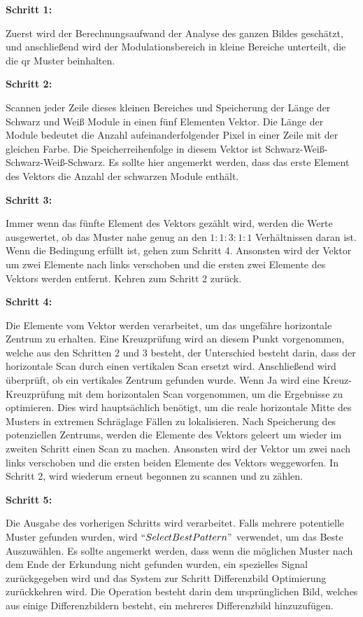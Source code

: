 \textbf{Schritt 1:}

Zuerst wird der Berechnungsaufwand der Analyse des ganzen Bildes geschätzt, und anschließend wird der Modulationsbereich in kleine Bereiche unterteilt, die die \gls{qr} Muster beinhalten.

\textbf{Schritt 2:}

Scannen jeder Zeile dieses kleinen Bereiches und Speicherung der Länge der Schwarz und Weiß Module in einen fünf Elementen Vektor. Die Länge der Module bedeutet die Anzahl aufeinanderfolgender Pixel in einer Zeile mit der gleichen Farbe. Die Speicherreihenfolge in diesem Vektor ist Schwarz-Weiß-Schwarz-Weiß-Schwarz. Es sollte hier angemerkt werden, dass das erste Element des Vektors die Anzahl der schwarzen Module enthält. 

\textbf{Schritt 3:}

Immer wenn das fünfte Element des Vektors gezählt wird, werden die Werte ausgewertet, ob das Muster nahe genug an den $1:1:3:1:1$ Verhältnissen daran ist. Wenn die Bedingung erfüllt ist, gehen zum Schritt 4. Ansonsten wird der Vektor um zwei Elemente nach links verschoben und die ersten zwei Elemente des Vektors werden entfernt. Kehren zum Schritt 2 zurück.
              

\textbf{Schritt 4:}

Die Elemente vom Vektor werden verarbeitet, um das ungefähre horizontale Zentrum zu erhalten. Eine Kreuzprüfung wird an diesem Punkt vorgenommen, welche aus den Schritten 2 und 3 besteht, der Unterschied besteht darin, dass der horizontale Scan durch einen vertikalen Scan ersetzt wird. Anschließend wird überprüft, ob ein vertikales Zentrum gefunden wurde. Wenn Ja wird eine Kreuz-Kreuzprüfung mit dem horizontalen Scan vorgenommen, um die Ergebnisse zu optimieren. Dies wird hauptsächlich benötigt, um die reale horizontale Mitte des Musters in extremen Schräglage Fällen zu lokalisieren. Nach Speicherung des potenziellen Zentrums, werden die Elemente des Vektors geleert um wieder im zweiten Schritt einen Scan zu machen. Ansonsten wird der Vektor um zwei nach links verschoben und die ersten beiden Elemente des Vektors weggeworfen. In Schritt 2, wird wiederum erneut begonnen zu scannen und zu zählen.  

\textbf{Schritt 5:}

Die Ausgabe des vorherigen Schritts wird verarbeitet. Falls mehrere potentielle Muster gefunden wurden, wird $ ``Select Best Pattern" $ verwendet, um das Beste Auszuwählen. Es sollte angemerkt werden, dass wenn die möglichen Muster nach dem Ende der Erkundung nicht gefunden wurden, ein spezielles Signal zurückgegeben wird und das System zur Schritt Differenzbild Optimierung zurückkehren wird. Die Operation besteht darin dem ursprünglichen Bild, welches aus einige Differenzbildern besteht, ein mehreres Differenzbild hinzuzufügen.
                       

